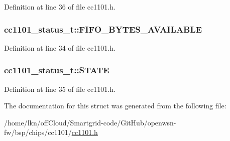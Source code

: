 Definition at line 36 of file cc1101.\+h.

\subsubsection[{\texorpdfstring{F\+I\+F\+O\+\_\+\+B\+Y\+T\+E\+S\+\_\+\+A\+V\+A\+I\+L\+A\+B\+LE}{FIFO_BYTES_AVAILABLE}}]{ cc1101\+\_\+status\+\_\+t\+::\+F\+I\+F\+O\+\_\+\+B\+Y\+T\+E\+S\+\_\+\+A\+V\+A\+I\+L\+A\+B\+LE}\hypertarget{structcc1101__status__t_a2201a1786d00a5856d01c4594af8b04a}{}\label{structcc1101__status__t_a2201a1786d00a5856d01c4594af8b04a}


Definition at line 34 of file cc1101.\+h.

\subsubsection[{\texorpdfstring{S\+T\+A\+TE}{STATE}}]{ cc1101\+\_\+status\+\_\+t\+::\+S\+T\+A\+TE}\hypertarget{structcc1101__status__t_a7bd620d285644ae86e8e81e36d9bba51}{}\label{structcc1101__status__t_a7bd620d285644ae86e8e81e36d9bba51}


Definition at line 35 of file cc1101.\+h.



The documentation for this struct was generated from the following file\+:\begin{DoxyCompactItemize}
\item 
/home/lkn/off\+Cloud/\+Smartgrid-\/code/\+Git\+Hub/openwsn-\/fw/bsp/chips/cc1101/\hyperlink{cc1101_8h}{cc1101.\+h}\end{DoxyCompactItemize}
